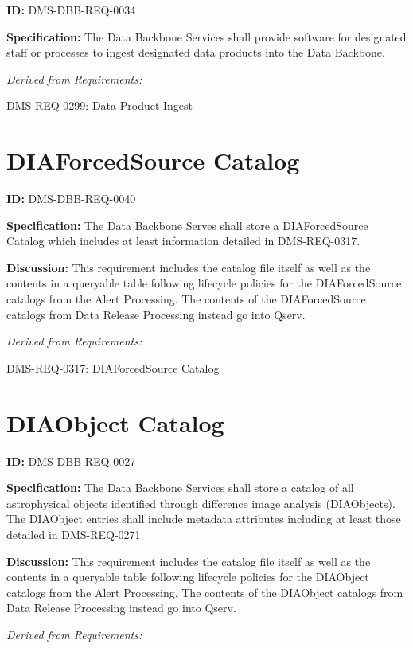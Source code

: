 \documentclass[SE,toc,lsstdraft]{lsstdoc}
\begin{document}
\label{DMS-DBB-REQ-0034}
\textbf{ID:} DMS-DBB-REQ-0034

\textbf{Specification:}
The Data Backbone Services shall provide software for designated staff or processes to ingest designated data products into the Data Backbone.

\emph{Derived from Requirements:}

DMS-REQ-0299:
Data Product Ingest \newline

\section{DIAForcedSource Catalog}

\label{DMS-DBB-REQ-0040}
\textbf{ID:} DMS-DBB-REQ-0040

\textbf{Specification:}
The Data Backbone Serves shall store a DIAForcedSource Catalog which includes at least information detailed in DMS-REQ-0317.

\textbf{Discussion:}
This requirement includes the catalog file itself as well as the contents in a queryable table following lifecycle policies for the DIAForcedSource catalogs from the Alert Processing.  The contents of the DIAForcedSource catalogs from Data Release Processing instead go into Qserv.

\emph{Derived from Requirements:}

DMS-REQ-0317:
DIAForcedSource Catalog \newline

\section{DIAObject Catalog}

\label{DMS-DBB-REQ-0027}
\textbf{ID:} DMS-DBB-REQ-0027

\textbf{Specification:}
The Data Backbone Services shall store a catalog of all astrophysical objects identified through difference image analysis (DIAObjects). The DIAObject entries shall include metadata attributes including at least those detailed in DMS-REQ-0271.

\textbf{Discussion:}
This requirement includes the catalog file itself as well as the contents in a queryable table following lifecycle policies for the DIAObject catalogs from the Alert Processing.  The contents of the DIAObject catalogs from Data Release Processing instead go into Qserv.

\emph{Derived from Requirements:}
\end{document}
